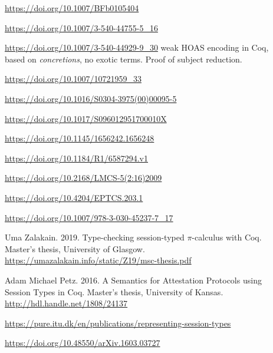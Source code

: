 \begin{description}
\item[\cite{Gordon1996}]                  \url{https://doi.org/10.1007/BFb0105404}
\item[\cite{Gay2001}]                     \url{https://doi.org/10.1007/3-540-44755-5_16}
\item[\cite{Despeyroux2000}]              \url{https://doi.org/10.1007/3-540-44929-9_30}
  weak HOAS encoding in Coq, based on \emph{concretions}, no exotic terms. Proof of subject reduction.
\item[\cite{Gillard2000}]                 \url{https://doi.org/10.1007/10721959_33}
\item[\cite{Honsell2001}]                 \url{https://doi.org/10.1016/S0304-3975(00)00095-5}
\item[\cite{Perera2018}]                  \url{https://doi.org/10.1017/S096012951700010X}
\item[\cite{Tiu2010}]                     \url{https://doi.org/10.1145/1656242.1656248}
\item[\cite{Cervesato2007}]               \url{https://doi.org/10.1184/R1/6587294.v1}
\item[\cite{Bengtson2009}]                \url{https://doi.org/10.2168/LMCS-5(2:16)2009}
\item[\cite{Orchard2016}]                 \url{https://doi.org/10.4204/EPTCS.203.1}
\item[\cite{Castro2020}]                  \url{https://doi.org/10.1007/978-3-030-45237-7_17}
\item[\cite{Zalakain2019}]                Uma Zalakain. 2019. Type-checking session-typed $\pi$-calculus with Coq. Master's thesis, University of Glasgow. \url{https://umazalakain.info/static/Z19/msc-thesis.pdf}
\item[\cite{Petz2016}]                    Adam Michael Petz. 2016. A Semantics for Attestation Protocols using Session Types in Coq. Master's thesis, University of Kansas. \url{http://hdl.handle.net/1808/24137}
\item[\cite{Bock2016}]                    \url{https://pure.itu.dk/en/publications/representing-session-types}
\item[\cite{Xi2016}]                      \url{https://doi.org/10.48550/arXiv.1603.03727}

\end{description}
